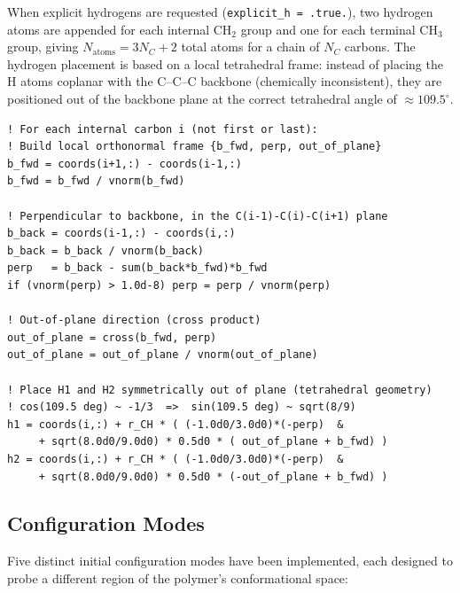 \documentclass[11pt, a4paper]{article}
\begin{document}
When explicit hydrogens are requested (\texttt{explicit\_h = .true.}), two
hydrogen atoms are appended for each internal CH$_2$ group and one for each
terminal CH$_3$ group, giving $N_{\text{atoms}} = 3N_C + 2$ total atoms for
a chain of $N_C$ carbons. The hydrogen placement is based on a local tetrahedral
frame: instead of placing the H atoms coplanar with the C--C--C backbone (chemically inconsistent), they are positioned out of the
backbone plane at the correct tetrahedral angle of $\approx 109.5^\circ$.

\begin{lstlisting}[caption={Out-of-plane hydrogen placement for internal CH$_2$ groups.}]
! For each internal carbon i (not first or last):
! Build local orthonormal frame {b_fwd, perp, out_of_plane}
b_fwd = coords(i+1,:) - coords(i-1,:)
b_fwd = b_fwd / vnorm(b_fwd)

! Perpendicular to backbone, in the C(i-1)-C(i)-C(i+1) plane
b_back = coords(i-1,:) - coords(i,:)
b_back = b_back / vnorm(b_back)
perp   = b_back - sum(b_back*b_fwd)*b_fwd
if (vnorm(perp) > 1.0d-8) perp = perp / vnorm(perp)

! Out-of-plane direction (cross product)
out_of_plane = cross(b_fwd, perp)
out_of_plane = out_of_plane / vnorm(out_of_plane)

! Place H1 and H2 symmetrically out of plane (tetrahedral geometry)
! cos(109.5 deg) ~ -1/3  =>  sin(109.5 deg) ~ sqrt(8/9)
h1 = coords(i,:) + r_CH * ( (-1.0d0/3.0d0)*(-perp)  &
     + sqrt(8.0d0/9.0d0) * 0.5d0 * ( out_of_plane + b_fwd) )
h2 = coords(i,:) + r_CH * ( (-1.0d0/3.0d0)*(-perp)  &
     + sqrt(8.0d0/9.0d0) * 0.5d0 * (-out_of_plane + b_fwd) )
\end{lstlisting}

\subsection{Configuration Modes}

Five distinct initial configuration modes have been implemented, each designed
to probe a different region of the polymer's conformational space:
\end{document}
